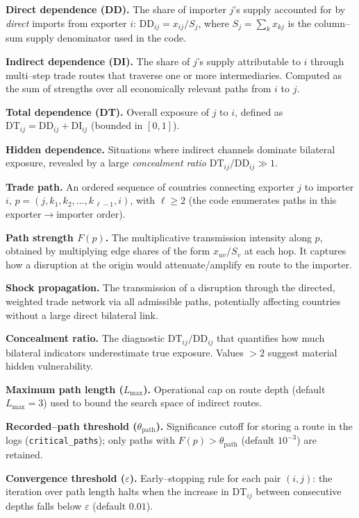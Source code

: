 \documentclass[final,1p,times,authoryear]{elsarticle}
\begin{document}
\textbf{Direct dependence (DD).}
The share of importer $j$’s supply accounted for by \emph{direct} imports from exporter $i$:
$\mathrm{DD}_{ij}=x_{ij}/S_j$, where $S_j=\sum_k x_{kj}$ is the column--sum supply denominator used in the code.

\textbf{Indirect dependence (DI).}
The share of $j$’s supply attributable to $i$ through multi–step trade routes that traverse one or more intermediaries. Computed as the sum of strengths over all economically relevant paths from $i$ to $j$.

\textbf{Total dependence (DT).}
Overall exposure of $j$ to $i$, defined as $\mathrm{DT}_{ij}=\mathrm{DD}_{ij}+\mathrm{DI}_{ij}$ (bounded in $[0,1]$).

\textbf{Hidden dependence.}
Situations where indirect channels dominate bilateral exposure, revealed by a large \emph{concealment ratio} $\mathrm{DT}_{ij}/\mathrm{DD}_{ij}\gg 1$.

\textbf{Trade path.}
An ordered sequence of countries connecting exporter $j$ to importer $i$,
$p=(j,k_1,k_2,\ldots,k_{\,\ell-1},i)$, with $\ell\ge2$ (the code enumerates paths in this exporter$\to$importer order).

\textbf{Path strength $F(p)$.}
The multiplicative transmission intensity along $p$, obtained by multiplying edge shares of the form $x_{uv}/S_v$ at each hop. It captures how a disruption at the origin would attenuate/amplify en route to the importer.

\textbf{Shock propagation.}
The transmission of a disruption through the directed, weighted trade network via all admissible paths, potentially affecting countries without a large direct bilateral link.

\textbf{Concealment ratio.}
The diagnostic $\mathrm{DT}_{ij}/\mathrm{DD}_{ij}$ that quantifies how much bilateral indicators underestimate true exposure. Values $>2$ suggest material hidden vulnerability.

\textbf{Maximum path length ($L_{\max}$).}
Operational cap on route depth (default $L_{\max}=3$) used to bound the search space of indirect routes.

\textbf{Recorded--path threshold ($\theta_{\text{path}}$).}
Significance cutoff for storing a route in the logs (\texttt{critical\_paths}); only paths with $F(p)>\theta_{\text{path}}$ (default $10^{-3}$) are retained.

\textbf{Convergence threshold ($\varepsilon$).}
Early--stopping rule for each pair $(i,j)$: the iteration over path length halts when the increase in $\mathrm{DT}_{ij}$ between consecutive depths falls below $\varepsilon$ (default $0.01$).
\end{document}
